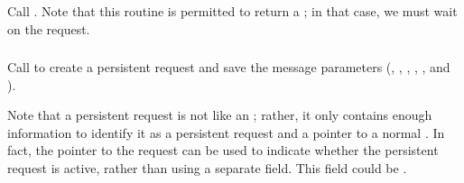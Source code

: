 \documentclass{article}
\begin{document}


\subsubsection{}
Call .  Note that this routine is permitted to return a
; in that case, we must wait on the request.



\subsubsection{}

Call  to create a persistent request and save
the message 
parameters (, 
, , 
,
, and
). 


Note that a persistent request is not like an
; rather, it only contains enough information
to identify it as a persistent request and a pointer to a normal
.  In fact, the pointer to the request can be
used to indicate whether the persistent request is active, rather than
using a separate field.  This field could be
.
\end{document}
